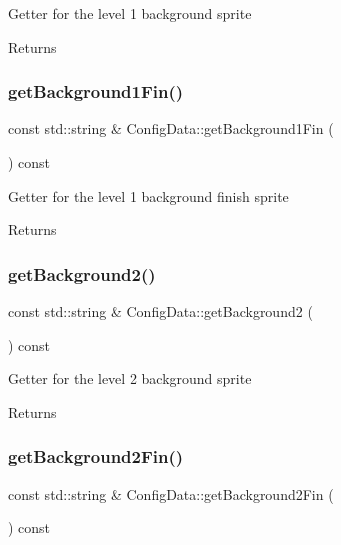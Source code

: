 Getter for the level 1 background sprite \begin{DoxyReturn}{Returns}

\end{DoxyReturn}
\mbox{\label{classConfigData_a73f750c44eee20c091b2a3984b42f5ec}} 
\subsubsection{\texorpdfstring{get\+Background1\+Fin()}{getBackground1Fin()}}
{\footnotesize\ttfamily const std\+::string \& Config\+Data\+::get\+Background1\+Fin (\begin{DoxyParamCaption}{ }\end{DoxyParamCaption}) const}

Getter for the level 1 background finish sprite \begin{DoxyReturn}{Returns}

\end{DoxyReturn}
\mbox{\label{classConfigData_abaf686c98923cbd5b25d1135988499e7}} 
\subsubsection{\texorpdfstring{get\+Background2()}{getBackground2()}}
{\footnotesize\ttfamily const std\+::string \& Config\+Data\+::get\+Background2 (\begin{DoxyParamCaption}{ }\end{DoxyParamCaption}) const}

Getter for the level 2 background sprite \begin{DoxyReturn}{Returns}

\end{DoxyReturn}
\mbox{\label{classConfigData_ab4a6bf95cb21298a472a17763d56c35d}} 
\subsubsection{\texorpdfstring{get\+Background2\+Fin()}{getBackground2Fin()}}
{\footnotesize\ttfamily const std\+::string \& Config\+Data\+::get\+Background2\+Fin (\begin{DoxyParamCaption}{ }\end{DoxyParamCaption}) const}

